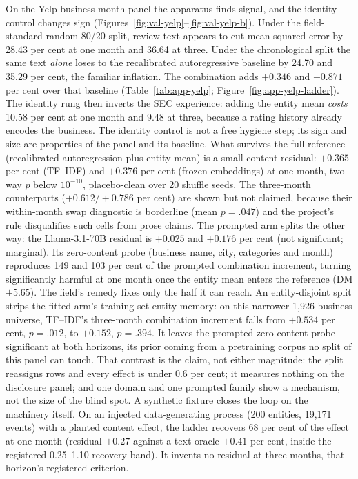 On the Yelp business-month panel the apparatus finds signal, and the identity control changes sign (Figures~\ref{fig:val-yelp}--\ref{fig:val-yelp-b}). Under the field-standard random 80/20 split, review text appears to cut mean squared error by 28.43 per cent at one month and 36.64 at three. Under the chronological split the same text \emph{alone} loses to the recalibrated autoregressive baseline by 24.70 and 35.29 per cent, the familiar inflation. The combination adds $+0.346$ and $+0.871$ per cent over that baseline (Table~\ref{tab:app-yelp}; Figure~\ref{fig:app-yelp-ladder}). %
The identity rung then inverts the SEC experience: adding the entity mean \emph{costs} 10.58 per cent at one month and 9.48 at three, because a rating history already encodes the business. The identity control is not a free hygiene step; its sign and size are properties of the panel and its baseline. %
What survives the full reference (recalibrated autoregression plus entity mean) is a small content residual: $+0.365$ per cent (TF--IDF) and $+0.376$ per cent (frozen embeddings) at one month, two-way $p$ below $10^{-10}$, placebo-clean over 20 shuffle seeds. The three-month counterparts ($+0.612/+0.786$ per cent) are shown but not claimed, because their within-month swap diagnostic is borderline (mean $p=.047$) and the project's rule disqualifies such cells from prose claims. %
The prompted arm splits the other way: the Llama-3.1-70B residual is $+0.025$ and $+0.176$ per cent (not significant; marginal). Its zero-content probe (business name, city, categories and month) reproduces 149 and 103 per cent of the prompted combination increment, turning significantly harmful at one month once the entity mean enters the reference (DM $+5.65$). %
The field's remedy fixes only the half it can reach. An entity-disjoint split strips the fitted arm's training-set entity memory: on this narrower 1{,}926-business universe, TF--IDF's three-month combination increment falls from $+0.534$ per cent, $p=.012$, to $+0.152$, $p=.394$. It leaves the prompted zero-content probe significant at both horizons, its prior coming from a pretraining corpus no split of this panel can touch. %
That contrast is the claim, not either magnitude: the split reassigns rows and every effect is under 0.6 per cent; it measures nothing on the disclosure panel; and one domain and one prompted family show a mechanism, not the size of the blind spot.
A synthetic fixture closes the loop on the machinery itself. On an injected data-generating process (200 entities, 19{,}171 events) with a planted content effect, the ladder recovers 68 per cent of the effect at one month (residual $+0.27$ against a text-oracle $+0.41$ per cent, inside the registered 0.25--1.10 recovery band). It invents no residual at three months, that horizon's registered criterion. %

